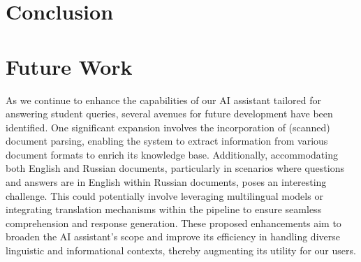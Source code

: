 \documentclass[conference, 11pt]{IEEEtran}
\begin{document}
\section{Conclusion}


\section{Future Work}

As we continue to enhance the capabilities of our AI assistant tailored for answering student queries, several avenues for future development have been identified. One significant expansion involves the incorporation of (scanned) document parsing, enabling the system to extract information from various document formats to enrich its knowledge base. Additionally, accommodating both English and Russian documents, particularly in scenarios where questions and answers are in English within Russian documents, poses an interesting challenge. This could potentially involve leveraging multilingual models or integrating translation mechanisms within the pipeline to ensure seamless comprehension and response generation. These proposed enhancements aim to broaden the AI assistant's scope and improve its efficiency in handling diverse linguistic and informational contexts, thereby augmenting its utility for our users.




\end{document}
